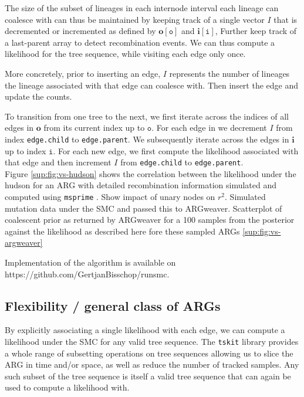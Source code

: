 \documentclass{article}
\begin{document}
The size of the subset of lineages in each internode interval each lineage 
can coalesce with can thus be maintained by keeping track of a single vector $I$ 
that is decremented or incremented as defined by
$\textbf{o}[\texttt{o}]$ and $\textbf{i}[\texttt{i}]$, 
Further keep track of a last-parent array to detect recombination events.
We can thus compute a likelihood for the tree sequence, while visiting each edge only once.

More concretely, prior to inserting an edge, $I$ represents the number of lineages 
the lineage associated with 
that edge can coalesce with. Then insert the edge and update the counts.

To transition from one tree to the next, we first iterate across the indices of all edges 
in $\textbf{o}$ from its current index up to $\texttt{o}$. For each edge in we decrement $I$ 
from index \texttt{edge.child} to \texttt{edge.parent}. We subsequently iterate across the 
edges in $\textbf{i}$ up to index $\texttt{i}$. For each new edge, we first compute the likelihood 
associated with that edge and then 
increment $I$ from \texttt{edge.child} to \texttt{edge.parent}.\\

Figure \ref{sup:fig:vs-hudson} shows the correlation between the likelihood under the hudson 
for an ARG with detailed recombination information simulated and computed using 
\texttt{msprime} \citep{baumdicker_efficient_2021}. Show impact of unary nodes on $r^2$.
Simulated mutation data under the SMC and passed this to ARGweaver.
Scatterplot of coalescent prior as returned by ARGweaver \citep{rasmussen_genome-wide_2014} 
for a 100 samples from the posterior against the likelihood as described here fore these 
sampled ARGs \ref{sup:fig:vs-argweaver}  

Implementation of the algorithm is available on https://github.com/GertjanBisschop/runsmc.

\subsection{Flexibility / general class of ARGs}

By explicitly associating a single likelihood with each edge, we can compute a likelihood 
under the SMC for any valid tree sequence. The \texttt{tskit} library provides a whole range  
of subsetting operations on tree sequences allowing us to slice the ARG in time and/or space, 
as well as reduce the number of tracked samples. 
Any such subset of the tree sequence is itself a valid tree sequence 
that can again be used to compute a likelihood with.
\end{document}
